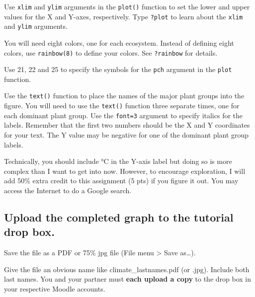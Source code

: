 \documentclass[11pt]{article}
\begin{document}
Use \texttt{xlim} and \texttt{ylim} arguments in the \texttt{plot()} function to set the lower and
upper values for the X and Y-axes, respectively. Type \texttt{?plot} to learn about
the \texttt{xlim} and \texttt{ylim} arguments.

You will need eight colors, one for each ecosystem. Instead of defining
eight colors, use \texttt{rainbow(8)} to define your colors. See \texttt{?rainbow} for
details.

Use 21, 22 and 25 to specify the symbols for the \texttt{pch} argument in the
\texttt{plot} function.

Use the \texttt{text()} function to place the names of the major plant groups
into the figure. You will need to use the \texttt{text()} function
three separate times, one for each dominant plant group. Use the \texttt{font=3}
argument to specify italics for the labels. Remember that the first two
numbers should be the X and Y coordinates for your text. The Y value may
be negative for one of the dominant plant group labels.

Technically, you should include °C in the Y-axis label but doing so is
more complex than I want to get into now. However, to encourage
exploration, I will add 50\% extra credit to this assignment (5 pts) if
you figure it out. You may access the Internet to do a Google search.

\subsection*{Upload the completed graph to the tutorial drop box.}

Save the file as a PDF or 75\% jpg file (File menu \textgreater{} Save
as\ldots{}).

Give the file an obvious name like climate\_lastnames.pdf (or .jpg).
Include both last names. You and your partner must \textbf{each upload a
copy} to the drop box in your respective Moodle accounts.
\end{document}
